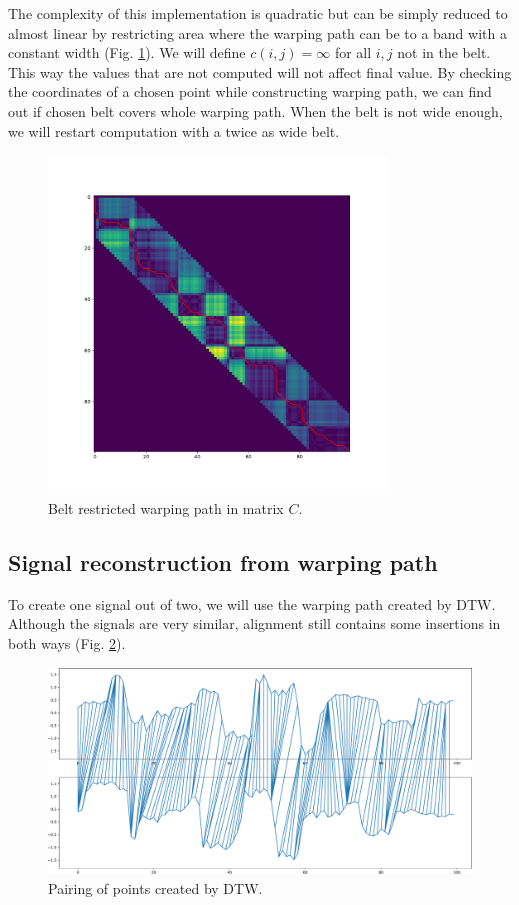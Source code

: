 The complexity of this implementation is quadratic but can be simply reduced to almost linear by restricting area where the warping path can be to a band with a constant width (Fig. \ref{fig:belt}). We will define $c(i,j)=\infty$ for all $i,j$ not in the belt. This way the values that are not computed will not affect final value. By checking the coordinates of a chosen point while constructing warping path, we can find out if chosen belt covers whole warping path. 
When the belt is not wide enough, we will restart computation with a twice as wide belt.
\begin{figure}[h]
  \centering
  \includegraphics[width=0.8\textwidth]{images/wp2}
  \caption{Belt restricted warping path in matrix $C$.}
  \label{fig:belt}
\end{figure}


\subsection{Signal reconstruction from warping path}

To create one signal out of two, we will use the warping path created by DTW.
Although the signals are very similar, alignment still contains some insertions in both ways (Fig. \ref{fig:pairing}). 
\begin{figure}
  \centering
  \includegraphics[width=1.0\textwidth]{images/ciary}
  \caption{Pairing of points created by DTW.}
  \label{fig:pairing}
\end{figure}


